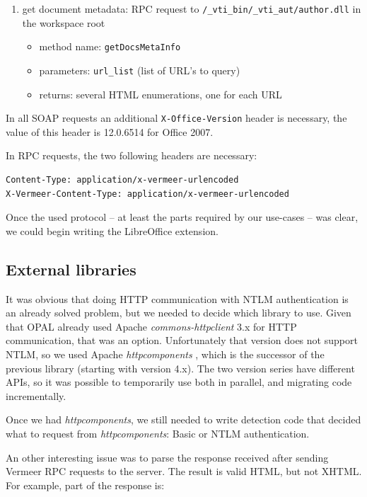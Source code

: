 \begin{enumerate}
\item get document metadata: RPC request to \texttt{/\_vti\_bin/\_vti\_aut/author.dll} in the workspace root
\begin{itemize}
\item method name: \texttt{getDocsMetaInfo}
\item parameters: \texttt{url\_list} (list of URL's to query)
\item returns: several HTML enumerations, one for each URL
\end{itemize}

\end{enumerate}

In all SOAP requests an additional \texttt{X-Office-Version} header is
necessary, the value of this header is 12.0.6514 for Office 2007.

In RPC requests, the two following headers are necessary:

\begin{lstlisting}
Content-Type: application/x-vermeer-urlencoded
X-Vermeer-Content-Type: application/x-vermeer-urlencoded
\end{lstlisting}

Once the used protocol -- at least the parts required by our use-cases -- was
clear, we could begin writing the LibreOffice extension.

\subsection{External libraries}

It was obvious that doing HTTP communication with NTLM authentication is an
already solved problem, but we needed to decide which library to use. Given that
OPAL already used Apache \emph{commons-httpclient} \cite{httpclient} 3.x for
HTTP communication, that was an option. Unfortunately that version does not support NTLM, so we used
Apache \emph{httpcomponents} \cite{httpcomponents}, which is the successor of
the previous library (starting with version 4.x). The two version series have
different APIs, so it was possible to temporarily use both in parallel, and migrating code
incrementally.

Once we had \emph{httpcomponents}, we still needed to write detection code that
decided what to request from \emph{httpcomponents}: Basic or NTLM
authentication.

An other interesting issue was to parse the response received after sending
Vermeer RPC requests to the server. The result is valid HTML, but not XHTML.
For example, part of the response is:

